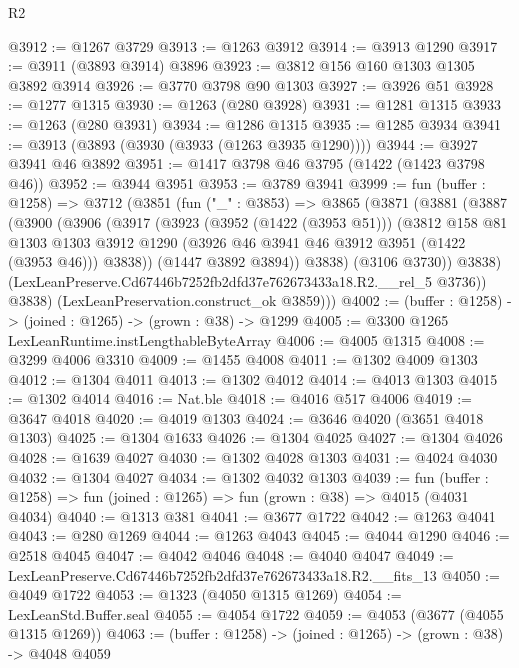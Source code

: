 \begin{lexlean}{R2}
\begin{coremodule}
@3912 := @1267 @3729
@3913 := @1263 @3912
@3914 := @3913 @1290
@3917 := @3911 (@3893 @3914) @3896
@3923 := @3812 @156 @160 @1303 @1305 @3892 @3914
@3926 := @3770 @3798 @90 @1303
@3927 := @3926 @51
@3928 := @1277 @1315
@3930 := @1263 (@280 @3928)
@3931 := @1281 @1315
@3933 := @1263 (@280 @3931)
@3934 := @1286 @1315
@3935 := @1285 @3934
@3941 := @3913 (@3893 (@3930 (@3933 (@1263 @3935 @1290))))
@3944 := @3927 @3941 @46 @3892
@3951 := @1417 @3798 @46 @3795 (@1422 (@1423 @3798 @46))
@3952 := @3944 @3951
@3953 := @3789 @3941
@3999 := fun (buffer : @1258) =>
  @3712
    (@3851
      (fun ("_" : @3853) =>
      @3865
        (@3871
          (@3881
            (@3887
              (@3900
                (@3906
                  (@3917
                    (@3923
                      (@3952 (@1422 (@3953 @51)))
                      (@3812
                        @158
                        @81
                        @1303
                        @1303
                        @3912
                        @1290
                        (@3926 @46 @3941 @46 @3912 @3951 (@1422 (@3953 @46)))
                        @3838))
                    (@1447 @3892 @3894))
                  @3838)
                (@3106 @3730))
              @3838)
            (LexLeanPreserve.Cd67446b7252fb2dfd37e762673433a18.R2.__rel_5 @3736))
          @3838)
        (LexLeanPreservation.construct_ok @3859)))
@4002 := (buffer : @1258) -> (joined : @1265) -> (grown : @38) -> @1299
@4005 := @3300 @1265 LexLeanRuntime.instLengthableByteArray
@4006 := @4005 @1315
@4008 := @3299 @4006 @3310
@4009 := @1455 @4008
@4011 := @1302 @4009 @1303
@4012 := @1304 @4011
@4013 := @1302 @4012
@4014 := @4013 @1303
@4015 := @1302 @4014
@4016 := Nat.ble
@4018 := @4016 @517 @4006
@4019 := @3647 @4018
@4020 := @4019 @1303
@4024 := @3646 @4020 (@3651 @4018 @1303)
@4025 := @1304 @1633
@4026 := @1304 @4025
@4027 := @1304 @4026
@4028 := @1639 @4027
@4030 := @1302 @4028 @1303
@4031 := @4024 @4030
@4032 := @1304 @4027
@4034 := @1302 @4032 @1303
@4039 := fun (buffer : @1258) => fun (joined : @1265) => fun (grown : @38) => @4015 (@4031 @4034)
@4040 := @1313 @381
@4041 := @3677 @1722
@4042 := @1263 @4041
@4043 := @280 @1269
@4044 := @1263 @4043
@4045 := @4044 @1290
@4046 := @2518 @4045
@4047 := @4042 @4046
@4048 := @4040 @4047
@4049 := LexLeanPreserve.Cd67446b7252fb2dfd37e762673433a18.R2.__fits_13
@4050 := @4049 @1722
@4053 := @1323 (@4050 @1315 @1269)
@4054 := LexLeanStd.Buffer.seal
@4055 := @4054 @1722
@4059 := @4053 (@3677 (@4055 @1315 @1269))
@4063 := (buffer : @1258) -> (joined : @1265) -> (grown : @38) -> @4048 @4059

\end{coremodule}
\end{lexlean}
